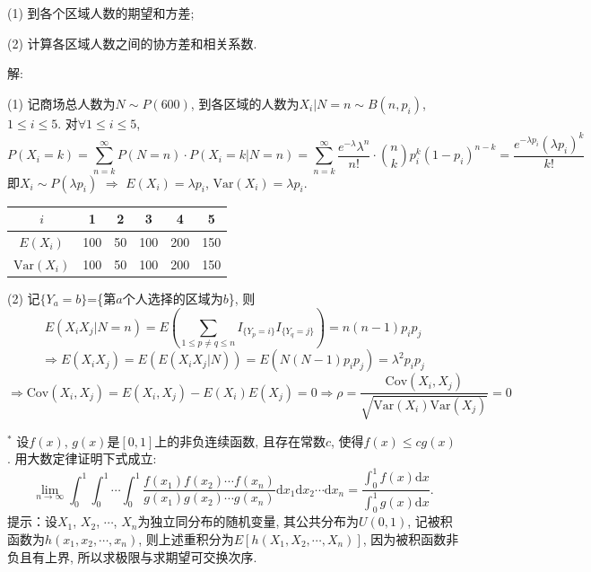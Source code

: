 \documentclass[standard]{ExBook}
\renewenvironment{shaded}{%
  \def\FrameCommand{\fboxsep=\FrameSep \colorbox{shadecolor}}%
  \MakeFramed{\advance\hsize-\width \FrameRestore}%
}{%
  \endMakeFramed
}
\begin{document}
\begin{qitems}
\begin{bbox}
\begin{shaded}
(1) 到各个区域人数的期望和方差;

(2) 计算各区域人数之间的协方差和相关系数.
    \end{shaded}
    \end{bbox}

\vspace{\dimexpr2.5cm-5em\relax}

解: 

(1) 记商场总人数为$N\sim P(600)$, 到各区域的人数为$X_i|N=n\sim B(n,p_i)$, $1\leq i\leq 5$. 对$\forall 1\leq i\leq 5$,
$$\displaystyle P(X_i=k)=\sum\limits_{n=k}^{\infty}P(N=n)\cdot P(X_i=k|N=n)=\sum\limits_{n=k}^{\infty}\frac{e^{-\lambda}\lambda^n}{n!}\cdot \binom{n}{k}p_i^k(1-p_i)^{n-k}=\frac{e^{-\lambda p_i}(\lambda p_i)^k}{k!}$$
即$X_i\sim P(\lambda p_i)$ $\Longrightarrow$ $E(X_i)=\lambda p_i$, $\mathrm{Var}(X_i)=\lambda p_i$.

\vspace{0.5em}
\setlength{\tabcolsep}{1.75em}
\begin{minipage}[c]{1\textwidth}
\centering
\begin{tabular}{c|c|c|c|c|c}
    $i$ & 1 & 2 & 3 & 4 & 5\\
    \hline
    $E(X_i)$ & 100 & 50 & 100 & 200 & 150\\
    \hline
    $\mathrm{Var}(X_i)$ & 100 & 50 & 100 & 200 & 150
\end{tabular}
\end{minipage}

(2) 记$\{Y_{a}=b\}$=\{第$a$个人选择的区域为$b$\}, 则
$$\displaystyle E(X_i X_j|N=n)=E\left(\sum\limits_{1\leq p\neq q\leq n}I_{\{Y_p=i\}}I_{\{Y_q=j\}}\right)=n(n-1)p_i p_j$$
$$\Longrightarrow E(X_i X_j)=E(E(X_i X_j|N))=E(N(N-1)p_i p_j)=\lambda^2 p_i p_j$$
$$\displaystyle \Longrightarrow \mathrm{Cov}(X_i,X_j)=E(X_i,X_j)-E(X_i)E(X_j)=0 \Longrightarrow \rho=\frac{\mathrm{Cov}(X_i,X_j)}{\sqrt{\mathrm{Var}(X_i)\mathrm{Var}(X_j)}}=0$$

\vspace{2.5cm-5em}

    \begin{bbox}
    \begin{shaded}
        \qitem$^{*}$
设$f(x)$, $g(x)$是$[0,1]$上的非负连续函数, 且存在常数$c$, 使得$f(x)\leq c g(x)$. 用大数定律证明下式成立:
$$\lim\limits_{n\to\infty}\displaystyle\int_{0}^{1}\int_{0}^{1}\cdots\int_{0}^{1}\frac{f(x_1)f(x_2)\cdots f(x_n)}{g(x_1)g(x_2)\cdots g(x_n)}\mathrm{d}x_1\mathrm{d}x_2\cdots\mathrm{d}x_n=\frac{\int_{0}^{1}f(x)\mathrm{d}x}{\int_{0}^{1}g(x)\mathrm{d}x}.$$
提示：设$X_1$, $X_2$, $\cdots$, $X_n$为独立同分布的随机变量, 其公共分布为$U(0,1)$, 记被积函数为$h(x_1,x_2,\cdots,x_n)$, 则上述重积分为$E[h(X_1,X_2,\cdots,X_n)]$, 因为被积函数非负且有上界, 所以求极限与求期望可交换次序.
    \end{shaded}
    \end{bbox}


\end{qitems}
\end{document}

